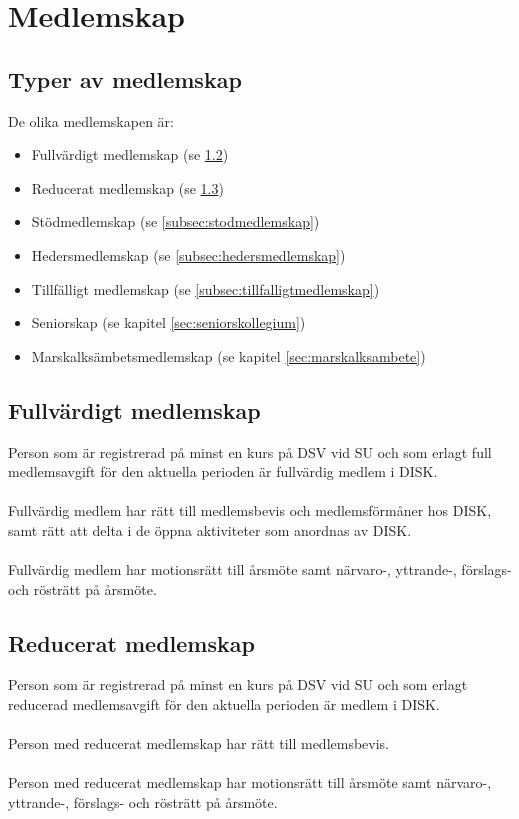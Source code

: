 \clearpage
\section{Medlemskap}
\label{sec:medlemskap}

	\subsection{Typer av medlemskap}
	\label{subsec:medlemskap}
		De olika medlemskapen är:
		\begin{itemize}
		\setlength{\itemsep}{0.0cm}
		\setlength{\parskip}{0.0cm}
			\item Fullvärdigt medlemskap (se \ref{subsec:fullvardigtmedlemskap})
			\item Reducerat medlemskap (se \ref{subsec:reduceratmedlemskap})
			\item Stödmedlemskap (se \ref{subsec:stodmedlemskap})
			\item Hedersmedlemskap (se \ref{subsec:hedersmedlemskap})
			\item Tillfälligt medlemskap (se \ref{subsec:tillfalligtmedlemskap})
			\item Seniorskap (se kapitel \ref{sec:seniorskollegium})
			\item Marskalksämbetsmedlemskap (se kapitel \ref{sec:marskalksambete})
		\end{itemize}

	\subsection{Fullvärdigt medlemskap}
	\label{subsec:fullvardigtmedlemskap}
		Person som är registrerad på minst en kurs på DSV vid SU och som erlagt full medlems\-avgift för den aktuella perioden är fullvärdig medlem i DISK.\\ \\
		Fullvärdig medlem har rätt till medlemsbevis och medlemsförmåner hos DISK, samt rätt att delta i de öppna aktiviteter som anordnas av DISK.\\ \\
		Fullvärdig medlem har motionsrätt till årsmöte samt närvaro-, yttrande-, förslags- och rösträtt på årsmöte.

	\subsection{Reducerat medlemskap}
	\label{subsec:reduceratmedlemskap}
		Person som är registrerad på minst en kurs på DSV vid SU och som erlagt reducerad medlems\-avgift för den aktuella perioden är medlem i DISK.\\ \\
		Person med reducerat medlemskap har rätt till medlemsbevis.\\ \\
		Person med reducerat medlemskap har motionsrätt till årsmöte samt närvaro-, yttrande-, förslags- och rösträtt på årsmöte. 

